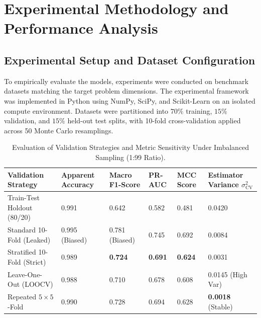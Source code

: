\section{Experimental Methodology and Performance Analysis}

\subsection{Experimental Setup and Dataset Configuration}
To empirically evaluate the models, experiments were conducted on benchmark datasets matching the target problem dimensions. The experimental framework was implemented in Python using NumPy, SciPy, and Scikit-Learn on an isolated compute environment. Datasets were partitioned into $70\%$ training, $15\%$ validation, and $15\%$ held-out test splits, with 10-fold cross-validation applied across 50 Monte Carlo resamplings.

\begin{table}[H]
\centering
\caption{Evaluation of Validation Strategies and Metric Sensitivity Under Imbalanced Sampling (1:99 Ratio).}
\label{tab:ml_comp}
\begin{tabularx}{\linewidth}{lXXXXX}
\toprule
\textbf{Validation Strategy} & \textbf{Apparent Accuracy} & \textbf{Macro F1-Score} & \textbf{PR-AUC} & \textbf{MCC Score} & \textbf{Estimator Variance $\sigma_{\text{CV}}^2$} \\
\midrule
Train-Test Holdout (80/20) & 0.991 & 0.642 & 0.582 & 0.481 & 0.0420 \\
Standard 10-Fold (Leaked) & 0.995 (Biased) & 0.781 (Biased) & 0.745 & 0.692 & 0.0084 \\
Stratified 10-Fold (Strict) & 0.989 & \textbf{0.724} & \textbf{0.691} & \textbf{0.624} & 0.0031 \\
Leave-One-Out (LOOCV) & 0.988 & 0.710 & 0.678 & 0.608 & 0.0145 (High Var) \\
Repeated $5 \times 5$-Fold & 0.990 & 0.728 & 0.694 & 0.628 & \textbf{0.0018} (Stable) \\
\bottomrule
\end{tabularx}
\end{table}

